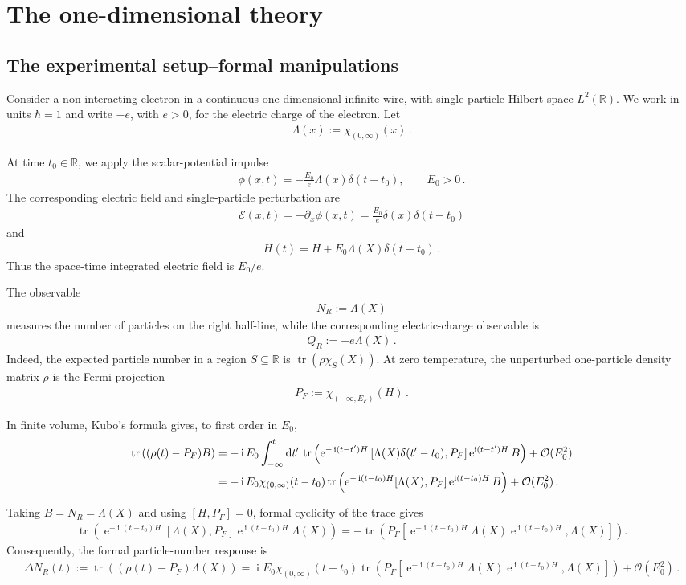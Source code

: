 \documentclass[a4paper,10pt]{article}
\numberwithin{equation}{section}
\theoremstyle{plain}
\theoremstyle{plain}
\theoremstyle{plain}
\theoremstyle{plain}
\theoremstyle{plain}
\theoremstyle{remark}
\theoremstyle{definition}
\theoremstyle{plain}
\newcommand{\ee}{\operatorname{e}}
\newcommand{\ii}{\operatorname{i}}
\newcommand{\RR}{\mathbb{R}}
\newcommand{\calO}{\mathcal{O}}
\newcommand{\dif}{\operatorname{d}\!} %
\newcommand{\tr}{\operatorname{tr}}
\newcommand{\eq}[1]{\begin{align*}#1\end{align*}}
\newcommand{\eql}[1]{\begin{align}#1\end{align}}
\begin{document}
\section{The one-dimensional theory}\label{sec:continuum}
    
    \subsection{The experimental setup--formal manipulations}

Consider a non-interacting electron in a continuous one-dimensional infinite
wire, with single-particle Hilbert space $L^2(\RR)$. We work in units
$\hbar=1$ and write $-e$, with $e>0$, for the electric charge of the
electron. Let
\eq{\Lambda(x):=\chi_{(0,\infty)}(x)\,.}

At time $t_0\in\RR$, we apply the scalar-potential impulse
\eq{\phi(x,t)=-\frac{E_0}{e}\Lambda(x)\delta(t-t_0),
\qquad E_0>0\,.}
The corresponding electric field and single-particle perturbation are
\eq{\mathcal{E}(x,t)
=-\partial_x\phi(x,t)
=\frac{E_0}{e}\delta(x)\delta(t-t_0)}
and
\eq{H(t)=H+E_0\Lambda(X)\delta(t-t_0)\,.}
Thus the space-time integrated electric field is $E_0/e$.

The observable
\eq{N_R:=\Lambda(X)}
measures the number of particles on the right half-line, while the
corresponding electric-charge observable is
\eq{Q_R:=-e\Lambda(X)\,.}
Indeed, the expected particle number in a region $S\subseteq\RR$ is
$\tr(\rho\chi_S(X))$. At zero temperature, the unperturbed one-particle
density matrix $\rho$ is the Fermi projection
\eq{P_F:=\chi_{(-\infty,E_F)}(H)\,.}

In finite volume, Kubo's formula
\cite{Kubo_57_I_doi:10.1143/JPSJ.12.570,
Kubo_57_II_doi:10.1143/JPSJ.12.1203,Bruus2004-lk}
gives, to first order in $E_0$,
\eql{\tr\left((\rho(t)-P_F)B\right)
&=-\ii E_0\int_{-\infty}^{t}\dif{t'}\,
\tr\left(
\ee^{-\ii(t-t')H}
\left[\Lambda(X)\delta(t'-t_0),P_F\right]
\ee^{\ii(t-t')H}B
\right)
+\calO(E_0^2)\notag\\
&=-\ii E_0\chi_{(0,\infty)}(t-t_0)
\tr\left(
\ee^{-\ii(t-t_0)H}
[\Lambda(X),P_F]
\ee^{\ii(t-t_0)H}B
\right)
+\calO(E_0^2)\,.
\label{eq:Kubo}}

Taking $B=N_R=\Lambda(X)$ and using $[H,P_F]=0$, formal cyclicity of the
trace gives
\eq{\tr\left(
\ee^{-\ii(t-t_0)H}
[\Lambda(X),P_F]
\ee^{\ii(t-t_0)H}\Lambda(X)
\right)
=
-\tr\left(
P_F\left[
\ee^{-\ii(t-t_0)H}\Lambda(X)\ee^{\ii(t-t_0)H},
\Lambda(X)
\right]
\right).}
Consequently, the formal particle-number response is
\eq{\Delta N_R(t)
:=\tr\left((\rho(t)-P_F)\Lambda(X)\right)
=
\ii E_0\chi_{(0,\infty)}(t-t_0)
\tr\left(
P_F\left[
\ee^{-\ii(t-t_0)H}\Lambda(X)\ee^{\ii(t-t_0)H},
\Lambda(X)
\right]
\right)
+\calO(E_0^2)\,.}
\end{document}
